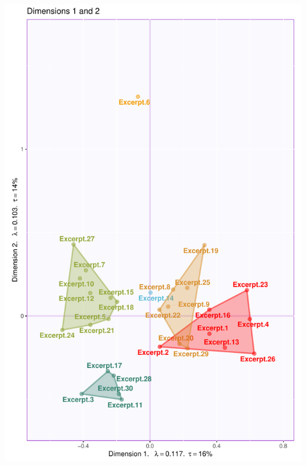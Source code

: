 \documentclass[
]{article}
\begin{document}
\begin{center}\includegraphics{MusDes_Supplementary_files/figure-latex/excerptsmaps23-1} \end{center}
\end{document}
